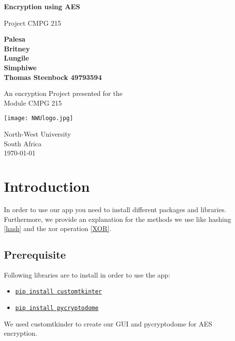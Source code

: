 \documentclass[]{article}
\begin{document}
\begin{titlepage}
    \begin{center}
        \vspace*{1cm}
            
        \Huge
        \textbf{Encryption using AES}
            
        \vspace{0.5cm}
        \Large
        Project CMPG 215
            
        \vspace{1.5cm}
            
        \textbf{Palesa\\
        Britney\\
        Lungile\\
        Simphiwe\\
        Thomas Steenbock 49793594}
            
        \vfill
            
        An encryption Project presented for the\\
        Module CMPG 215
            
        \vspace{1cm}
            
        \texttt{[image: NWUlogo.jpg]}
         
        \vspace{0.8cm}

        \Large
        North-West University\\
        South Africa\\
        \today
            
    \end{center}
\end{titlepage}

\tableofcontents
\newpage

\section{Introduction}
In order to use our app you need to install different packages and libraries. Furthermore, we provide
an explanation for the methods we use like hashing \ref{hash} and the xor operation \ref{XOR}.

\subsection{Prerequisite}
Following libraries are to install in order to use the app:
\begin{itemize}
    \item \href{https://pypi.org/project/customtkinter/}{\texttt{pip install customtkinter}}
    \item \href{https://pypi.org/project/pycryptodome/}{\texttt{pip install pycryptodome}}
\end{itemize}
We used customtkinder to create our GUI \cite{TomSchim}\cite{pythonhub}\cite{pytutorial} and pycryptodome 
for AES encryption. \cite{onboard}\cite{nitratine}\cite{pycrypto}
\end{document}
